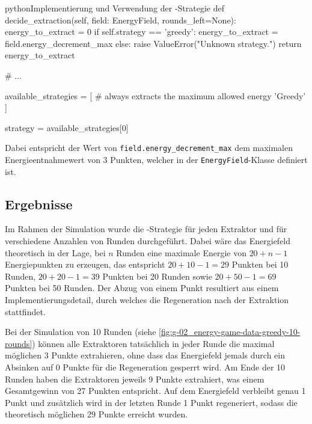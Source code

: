 \begin{snippet}[htb]
    \centering
    \begin{codebox}{python}{Implementierung und Verwendung der -Strategie}
        def decide_extraction(self, field: EnergyField, rounds_left=None):
            energy_to_extract = 0
            if self.strategy == 'greedy':
                energy_to_extract = field.energy_decrement_max
            else:
                raise ValueError("Unknown strategy.")
            return energy_to_extract
        
        # ...

        available_strategies = [
                # always extracts the maximum allowed energy
                'Greedy'                
            ]

        strategy = available_strategies[0]
    \end{codebox}
    \caption{Implementierung und Verwendung der -Strategie}
    \label{snippet:02-02-01_greedy-strategy}
\end{snippet}

Dabei entspricht der Wert von \texttt{field.energy\_decrement\_max} dem maximalen Energieentnahmewert von 3 Punkten, welcher in der \texttt{EnergyField}-Klasse definiert ist.

\subsection{Ergebnisse}
\label{sec:02-02-02_results}

Im Rahmen der Simulation wurde die -Strategie für jeden Extraktor und für verschiedene Anzahlen von Runden durchgeführt. Dabei wäre das Energiefeld theoretisch in der Lage, bei $n$ Runden eine maximale Energie von $20 + n - 1$ Energiepunkten zu erzeugen, das entspricht $20 + 10 - 1 = 29$ Punkten bei 10 Runden, $20 + 20 - 1 = 39$ Punkten bei 20 Runden sowie $20 + 50 - 1 = 69$ Punkten bei 50 Runden. Der Abzug von einem Punkt resultiert aus einem Implementierungsdetail, durch welches die Regeneration nach der Extraktion stattfindet.

Bei der Simulation von 10 Runden (siehe \autoref{fig:g-02_energy-game-data-greedy-10-rounds}) können alle Extraktoren tatsächlich in jeder Runde die maximal möglichen 3 Punkte extrahieren, ohne dass das Energiefeld jemals durch ein Absinken auf 0 Punkte für die Regeneration gesperrt wird. Am Ende der 10 Runden haben die Extraktoren jeweils 9 Punkte extrahiert, was einem Gesamtgewinn von 27 Punkten entspricht. Auf dem Energiefeld verbleibt genau 1 Punkt und zusätzlich wird in der letzten Runde 1 Punkt regeneriert, sodass die theoretisch möglichen 29 Punkte erreicht wurden.

